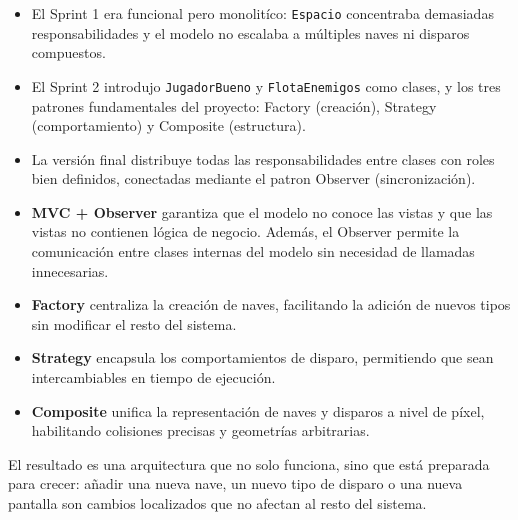 \documentclass[12pt, a4paper]{article}
\begin{document}
\begin{itemize}[leftmargin=2em]
    \item El Sprint 1 era funcional pero monolit\'{i}co: \texttt{Espacio} concentraba demasiadas responsabilidades y el modelo no escalaba a m\'{u}ltiples naves ni disparos compuestos.
    \item El Sprint 2 introdujo \texttt{JugadorBueno} y \texttt{FlotaEnemigos} como clases, y los tres patrones fundamentales del proyecto: Factory (creaci\'{o}n), Strategy (comportamiento) y Composite (estructura).
    \item La versi\'{o}n final distribuye todas las responsabilidades entre clases con roles bien definidos, conectadas mediante el patron Observer (sincronizaci\'{o}n).
    \item \textbf{MVC + Observer} garantiza que el modelo no conoce las vistas y que las vistas no contienen l\'{o}gica de negocio. Además, el Observer permite la comunicación entre clases internas del modelo sin necesidad de llamadas innecesarias.
    \item \textbf{Factory} centraliza la creaci\'{o}n de naves, facilitando la adici\'{o}n de nuevos tipos sin modificar el resto del sistema.
    \item \textbf{Strategy} encapsula los comportamientos de disparo, permitiendo que sean intercambiables en tiempo de ejecuci\'{o}n.
    \item \textbf{Composite} unifica la representaci\'{o}n de naves y disparos a nivel de p\'{i}xel, habilitando colisiones precisas y geometr\'{i}as arbitrarias.
\end{itemize}
 
El resultado es una arquitectura que no solo funciona, sino que est\'{a} preparada para crecer: a\~{n}adir una nueva nave, un nuevo tipo de disparo o una nueva pantalla son cambios localizados que no afectan al resto del sistema.
 
\end{document}
